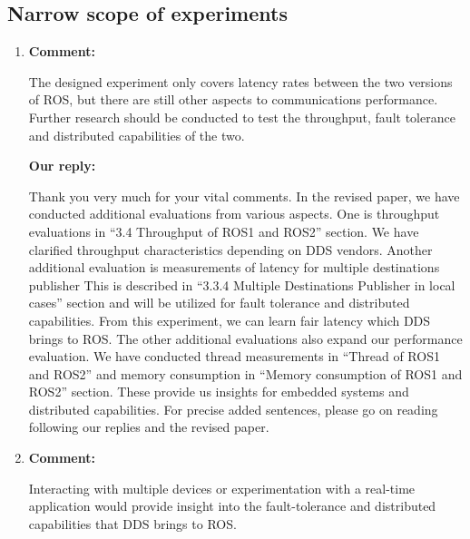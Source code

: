 \documentclass{article}
\begin{document}
\subsection{Narrow scope of experiments}
\begin{enumerate}

\item \begin{flushleft}
  \textbf{Comment:}
\end{flushleft}
  The designed experiment only covers latency rates between the two versions of ROS, but there are still other aspects to communications performance. Further research should be conducted to test the throughput, fault tolerance and distributed capabilities of the two.
  
  \begin{flushleft}
    \textbf{Our reply:}
  \end{flushleft}
  Thank you very much for your vital comments.
  In the revised paper, we have conducted additional evaluations from various aspects.
  One is throughput evaluations in ``3.4 Throughput of ROS1 and ROS2'' section.
  We have clarified throughput characteristics depending on DDS vendors.
  Another additional evaluation is measurements of latency for multiple destinations publisher
  This is described in ``3.3.4 Multiple Destinations Publisher in local cases'' section and will be utilized for fault tolerance and distributed capabilities.
  From this experiment, we can learn fair latency which DDS brings to ROS.
  The other additional evaluations also expand our performance evaluation.
  We have conducted thread measurements in ``Thread of ROS1 and ROS2'' and memory consumption in ``Memory consumption of ROS1 and ROS2'' section.
  These provide us insights for embedded systems and distributed capabilities.
  For precise added sentences, please go on reading following our replies and the revised paper.
  
\item \begin{flushleft}
  \textbf{Comment:}
\end{flushleft}
  Interacting with multiple devices or experimentation with a real-time application would provide insight into the fault-tolerance and distributed capabilities that DDS brings to ROS.
  

\end{enumerate}
\end{document}
